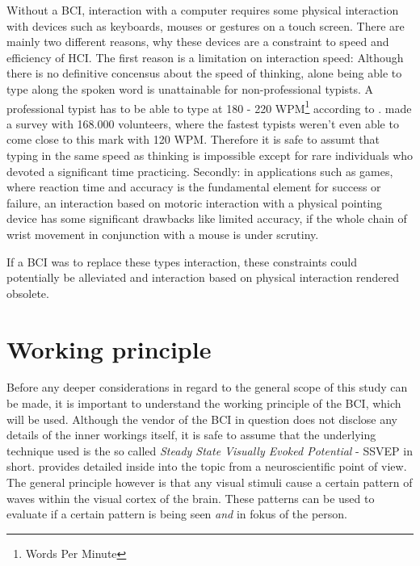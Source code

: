             Without a BCI, interaction with a computer requires some physical interaction with devices such as keyboards, mouses or gestures on a touch screen. There are mainly two different reasons, why these devices are a constraint to speed and efficiency of HCI. The first reason is a limitation on interaction speed: Although there is no definitive concensus about the speed of thinking, alone being able to type along the spoken word is unattainable for non-professional typists. A professional typist has to be able to type at 180 - 220 WPM\footnote{Words Per Minute} according to \cite{NCRA.25052021}. \cite{ScienceDaily.25052021} made a survey with 168.000 volunteers, where the fastest typists weren't even able to come close to this mark with 120 WPM. Therefore it is safe to assumt that typing in the same speed as thinking is impossible except for rare individuals who devoted a significant time practicing. Secondly: in applications such as games, where reaction time and accuracy is the fundamental element for success or failure, an interaction based on motoric interaction with a physical pointing device has some significant drawbacks like limited accuracy, if the whole chain of wrist movement in conjunction with a mouse is under scrutiny. 

            If a BCI was to replace these types interaction, these constraints could potentially be alleviated and interaction based on physical interaction rendered obsolete. 

        \section{Working principle}\label{working-principle}         

            Before any deeper considerations in regard to the general scope of this study can be made, it is important to understand the working principle of the BCI, which will be used. Although the vendor of the BCI in question does not disclose any details of the inner workings itself, it is safe to assume that the underlying technique used is the so called \textit{Steady State Visually Evoked Potential} - SSVEP in short. \cite{Sokol.1976} provides detailed inside into the topic from a neuroscientific point of view. The general principle however is that any visual stimuli cause a certain pattern of waves within the visual cortex of the brain. These patterns can be used to evaluate if a certain pattern is being seen \textit{and} in fokus of the person. 
            
